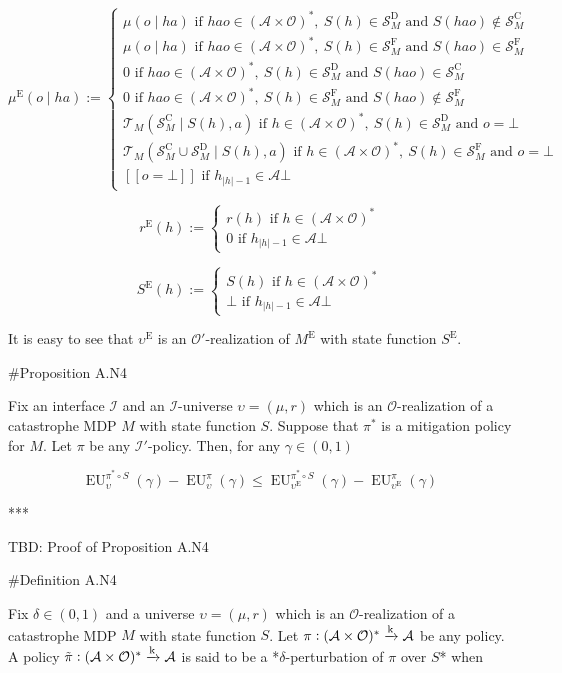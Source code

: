 \documentclass[a4paper]{article}
\newcommand{\AP}[1]{\left(#1\right)}
\newcommand{\Abs}[1]{\lvert #1 \rvert}
\newcommand{\M}{\xrightarrow{\textnormal{k}}}
\newcommand{\Ob}{\mathcal{O}}
\newcommand{\A}{\mathcal{A}}
\newcommand{\St}{\mathcal{S}}
\newcommand{\T}{\mathcal{T}}
\newcommand{\In}{\mathcal{I}}
\newcommand{\FH}{(\A \times \Ob)^*}
\newcommand{\RMC}{\mathrm{C}}
\newcommand{\RMD}{\mathrm{D}}
\newcommand{\RME}{\mathrm{E}}
\newcommand{\RMF}{\mathrm{F}}
\newcommand{\SF}{\St^{\RMF}}
\newcommand{\SD}{\St^{\RMD}}
\newcommand{\SC}{\St^{\RMC}}
\newcommand{\ME}{M^{\RME}}
\newcommand{\EU}{\operatorname{EU}}
\begin{document}
$$\mu^\RME(o \mid ha) := \begin{cases} \mu(o \mid ha) \text{ if } hao\in\FH,\ S(h) \in \SD_M \text{ and } S(hao)\not\in\SC_M \\ \mu(o \mid ha) \text{ if } hao\in\FH,\ S(h) \in \SF_M \text{ and } S(hao)\in\SF_M \\ 0 \text{ if } hao\in\FH,\ S(h)\in\SD_M \text{ and } S(hao)\in\SC_M \\ 0 \text{ if } hao\in\FH,\ S(h)\in\SF_M \text{ and } S(hao)\not\in\SF_M \\ \T_M\AP{\SC_M \mid S(h),a} \text{ if } h\in\FH,\ S(h)\in\SD_M \text{ and } o=\bot \\ \T_M\AP{\SC_M \cup \SD_M \mid S(h),a} \text{ if } h\in\FH,\ S(h) \in \SF_M \text{ and } o=\bot \\ [[o=\bot]] \text{ if } h_{\Abs{h}-1} \in \A  \bot\end{cases}$$

$$r^\RME(h):=\begin{cases} r(h) \text{ if } h\in\FH \\ 0 \text{ if } h_{\Abs{h}-1} \in \A \bot\end{cases}$$

$$S^\RME(h):=\begin{cases} S(h) \text{ if } h\in\FH \\ \bot \text{ if } h_{\Abs{h}-1} \in \A\bot\end{cases}$$

It is easy to see that $\upsilon^\RME$ is an $\Ob'$-realization of $\ME$ with state function $S^\RME$.

\#Proposition A.N4

Fix an interface $\In$ and an $\In$-universe $\upsilon=(\mu,r)$ which is an $\Ob$-realization of a catastrophe MDP $M$ with state function $S$. Suppose that $\pi^*$ is a mitigation policy for $M$. Let $\pi$ be any $\In'$-policy. Then, for any $\gamma\in(0,1)$

$$\EU_{\upsilon}^{\pi^* \circ S}(\gamma)-\EU_{\upsilon}^{\pi}(\gamma) \leq \EU_{\upsilon^\RME}^{\pi^* \circ S}(\gamma)-\EU_{\upsilon^\RME}^{\pi}(\gamma)$$

***

TBD: Proof of Proposition A.N4

\#Definition A.N4

Fix $\delta\in(0,1)$ and a universe $\upsilon=(\mu,r)$ which is an $\Ob$-realization of a catastrophe MDP $M$ with state function $S$. Let $\pi: \FH \M \A$ be any policy. A policy $\tilde{\pi}: \FH \M \A$ is said to be a *$\delta$-perturbation of $\pi$ over $S$* when
\end{document}

